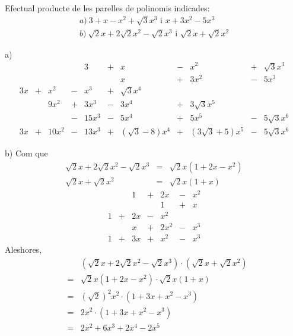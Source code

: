 \begin{exercici}
Efectual producte de les parelles de polinomis indicades:\[
\begin{array}{l}
a)~3+x-x^{2}+\sqrt{3}x^{3}\text{ i }x+3x^{2}-5x^{3} \\
b)~\sqrt{2}x+2\sqrt{2}x^{2}-\sqrt{2}x^{3}\text{ i }\sqrt{2}x+\sqrt{2}x^{2}\end{array}\]
\end{exercici}

\begin{solucio}
a)\[
\begin{array}{ccccccccccc}
& & & & 3 & + & x & - & x^{2} & + & \sqrt{3}x^{3} \\
& & & & & & x & + & 3x^{2} & - & 5x^{3} \\ \hline
3x & + & x^{2} & - & x^{3} & + & \sqrt{3}x^{4} & & & & \\
& & 9x^{2} & + & 3x^{3} & - & 3x^{4} & + & 3\sqrt{3}x^{5} & & \\
& & & - & 15x^{3} & - & 5x^{4} & + & 5x^{5} & - & 5\sqrt{3}x^{6} \\ \hline
3x & + & 10x^{2} & - & 13x^{3} & + & (\sqrt{3}-8)x^{4} & + & (3\sqrt{3}+5)x^{5} & - & 5\sqrt{3}x^{6}\end{array}\]

b) Com que\begin{eqnarray*}
\sqrt{2}x+2\sqrt{2}x^{2}-\sqrt{2}x^{3} &=&\sqrt{2}x\left( 1+2x-x^{2}\right)
\\
\sqrt{2}x+\sqrt{2}x^{2} &=&\sqrt{2}x(1+x)
\end{eqnarray*}\[
\begin{array}{ccccccc}
& & 1 & + & 2x & - & x^{2} \\
& & & & 1 & + & x \\ \hline
1 & + & 2x & - & x^{2} & & \\
& & x & + & 2x^{2} & - & x^{3} \\ \hline
1 & + & 3x & + & x^{2} & - & x^{3}\end{array}\]Aleshores,\begin{eqnarray*}
&&\left( \sqrt{2}x+2\sqrt{2}x^{2}-\sqrt{2}x^{3}\right) \cdot \left( \sqrt{2}x+\sqrt{2}x^{2}\right) \\
&=&\sqrt{2}x\left( 1+2x-x^{2}\right) \cdot \sqrt{2}x(1+x) \\
&=&\left( \sqrt{2}\right) ^{2}x^{2}\cdot \left( 1+3x+x^{2}-x^{3}\right) \\
&=&2x^{2}\cdot \left( 1+3x+x^{2}-x^{3}\right) \\
&=&2x^{2}+6x^{3}+2x^{4}-2x^{5}
\end{eqnarray*}
\end{solucio}

